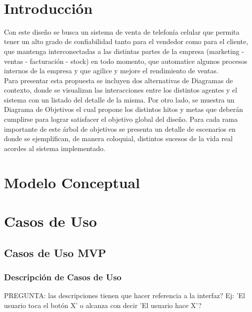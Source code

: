 ‌\section{Introducción}
Con este diseño se busca un sistema de venta de telefonía celular que permita tener un alto grado de confiabilidad tanto para el vendedor como para el cliente, que mantenga interconectadas a las distintas partes de la empresa (marketing - ventas - facturación - stock) en todo momento, que automatice algunos procesos internos de la empresa y que agilice y mejore el rendimiento de ventas.\\
\indent Para presentar esta propuesta se incluyen dos alternativas de Diagramas de contexto, donde se visualizan las interacciones entre los distintos agentes y el sistema con un listado del detalle de la misma. Por otro lado, se muestra un Diagrama de Objetivos el cual propone los distintos hitos y metas que deberán cumplirse para lograr satisfacer el objetivo global del diseño. Para cada rama importante de este árbol de objetivos se presenta un detalle de escenarios en donde se ejemplifican, de manera coloquial, distintos sucesos de la vida real acordes al sistema implementado.\\

\section{Modelo Conceptual}

\clearpage

\section{Casos de Uso}

\subsection{Casos de Uso MVP}

\subsubsection{Descripción de Casos de Uso}

PREGUNTA: las descripciones tienen que hacer referencia a la interfaz? Ej: 'El usuario toca el botón X' o alcanza con decir 'El usuario hace X'?
\vspace{0.5cm}

